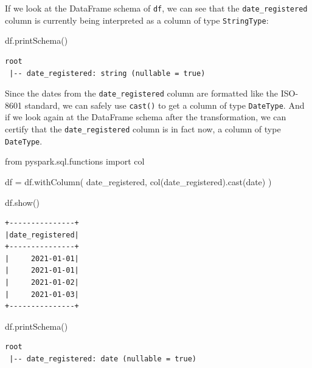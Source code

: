 \documentclass[
  11pt,
  letterpaper,
  DIV=11,
  numbers=noendperiod]{scrreprt}
\newenvironment{Shaded}{\begin{snugshade}}{\end{snugshade}}
\newcommand{\ImportTok}[1]{\textcolor[rgb]{0.00,0.46,0.62}{#1}}
\newcommand{\NormalTok}[1]{\textcolor[rgb]{0.00,0.23,0.31}{#1}}
\newcommand{\OperatorTok}[1]{\textcolor[rgb]{0.37,0.37,0.37}{#1}}
\newcommand{\StringTok}[1]{\textcolor[rgb]{0.13,0.47,0.30}{#1}}
\begin{document}
If we look at the DataFrame schema of \texttt{df}, we can see that the
\texttt{date\_registered} column is currently being interpreted as a
column of type \texttt{StringType}:

\begin{Shaded}
\begin{Highlighting}[]
\NormalTok{df.printSchema()}
\end{Highlighting}
\end{Shaded}

\begin{verbatim}
root
 |-- date_registered: string (nullable = true)
\end{verbatim}

Since the dates from the \texttt{date\_registered} column are formatted
like the ISO-8601 standard, we can safely use \texttt{cast()} to get a
column of type \texttt{DateType}. And if we look again at the DataFrame
schema after the transformation, we can certify that the
\texttt{date\_registered} column is in fact now, a column of type
\texttt{DateType}.

\begin{Shaded}
\begin{Highlighting}[]
\ImportTok{from}\NormalTok{ pyspark.sql.functions }\ImportTok{import}\NormalTok{ col}

\NormalTok{df }\OperatorTok{=}\NormalTok{ df.withColumn(}
    \StringTok{\textquotesingle{}date\_registered\textquotesingle{}}\NormalTok{,}
\NormalTok{    col(}\StringTok{\textquotesingle{}date\_registered\textquotesingle{}}\NormalTok{).cast(}\StringTok{\textquotesingle{}date\textquotesingle{}}\NormalTok{)}
\NormalTok{)}

\NormalTok{df.show()}
\end{Highlighting}
\end{Shaded}


\begin{verbatim}
+---------------+
|date_registered|
+---------------+
|     2021-01-01|
|     2021-01-01|
|     2021-01-02|
|     2021-01-03|
+---------------+
\end{verbatim}

\begin{Shaded}
\begin{Highlighting}[]
\NormalTok{df.printSchema()}
\end{Highlighting}
\end{Shaded}

\begin{verbatim}
root
 |-- date_registered: date (nullable = true)
\end{verbatim}
\end{document}
